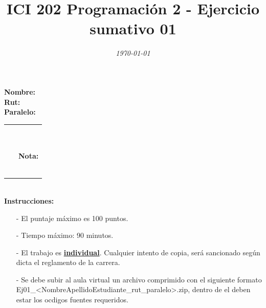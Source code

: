 \documentclass{exam}
\title{\LARGE\color{azul}\textbf{ICI 202 Programaci\'on 2 - Ejercicio sumativo 01 }}
\author{\normalsize \color{gray}{Prof.} \color{black}{\textbf{Ismael Figueroa, Eduardo Godoy}}}
\date{\normalsize \em \today}
\begin{document}

\maketitle

\begin{multicols}{2} \begin{flushleft} \textbf{Nombre:} \\ \vspace*{2mm} \textbf{Rut:} \\ \vspace*{2mm} \textbf{Paralelo:} \end{flushleft} \begin{center} \begin{table}[H] \begin{tabular}{p{4cm}|p{3cm}|} \arrayrulecolor{gray!50}\cline{2-2} ~ & {\em {\scriptsize \color{gray!50}{Puntaje:}}} \\ & ~ \\ ~ & \textbf{Nota:} \\ & ~ \\ \arrayrulecolor{gray!50}\cline{2-2} \end{tabular} \end{table} \end{center} \end{multicols}

\vspace*{-18mm}
\noindent
\textbf{\\Instrucciones:}
\begin{itemize}
    \item[-] El puntaje m\'aximo  es 100 puntos.
    \item[-] Tiempo m\'aximo: 90 minutos.
    \item[-] El trabajo es \underline{\textbf{individual}}. Cualquier intento de copia, ser\'a sancionado seg\'un dicta el reglamento de la carrera.
    \item[-] Se debe subir al aula virtual un archivo comprimido con el siguiente formato  Ej01\_<NombreApellidoEstudiante\_rut\_paralelo>.zip, dentro de el deben estar los ocdigos fuentes requeridos.
\end{itemize}
\end{document}
